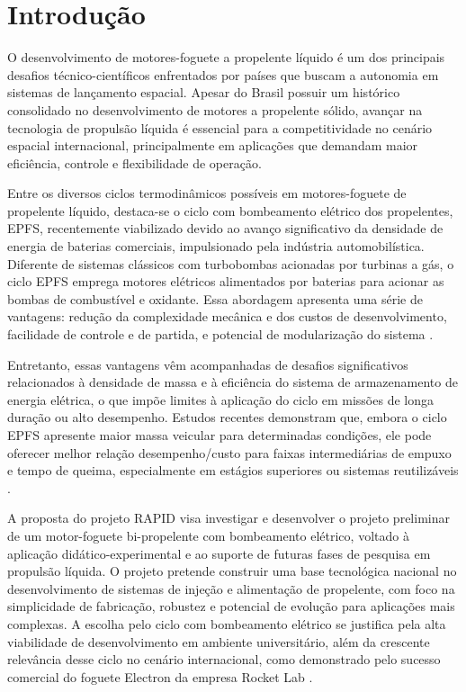 \chapter{Introdução}

O desenvolvimento de motores-foguete a propelente líquido é um dos principais desafios técnico-científicos enfrentados por países que buscam a autonomia em sistemas de lançamento espacial. Apesar do Brasil possuir um histórico consolidado no desenvolvimento de motores a propelente sólido, avançar na tecnologia de propulsão líquida é essencial para a competitividade no cenário espacial internacional, principalmente em aplicações que demandam maior eficiência, controle e flexibilidade de operação.

Entre os diversos ciclos termodinâmicos possíveis em motores-foguete de propelente líquido, destaca-se o ciclo com bombeamento elétrico dos propelentes, \Gls{EPFS}, recentemente viabilizado devido ao avanço significativo da densidade de energia de baterias comerciais, impulsionado pela indústria automobilística. Diferente de sistemas clássicos com turbobombas acionadas por turbinas a gás, o ciclo \Gls{EPFS} emprega motores elétricos alimentados por baterias para acionar as bombas de combustível e oxidante. Essa abordagem apresenta uma série de vantagens: redução da complexidade mecânica e dos custos de desenvolvimento, facilidade de controle e de partida, e potencial de modularização do sistema \cite{liuConceptKeyTechnology2021a}.

Entretanto, essas vantagens vêm acompanhadas de desafios significativos relacionados à densidade de massa e à eficiência do sistema de armazenamento de energia elétrica, o que impõe limites à aplicação do ciclo em missões de longa duração ou alto desempenho. Estudos recentes demonstram que, embora o ciclo \Gls{EPFS} apresente maior massa veicular para determinadas condições, ele pode oferecer melhor relação desempenho/custo para faixas intermediárias de empuxo e tempo de queima, especialmente em estágios superiores ou sistemas reutilizáveis \cite{Berg2023}.

A proposta do projeto \Gls{RAPID} visa investigar e desenvolver o projeto preliminar de um motor-foguete bi-propelente com bombeamento elétrico, voltado à aplicação didático-experimental e ao suporte de futuras fases de pesquisa em propulsão líquida. O projeto pretende construir uma base tecnológica nacional no desenvolvimento de sistemas de injeção e alimentação de propelente, com foco na simplicidade de fabricação, robustez e potencial de evolução para aplicações mais complexas. A escolha pelo ciclo com bombeamento elétrico se justifica pela alta viabilidade de desenvolvimento em ambiente universitário, além da crescente relevância desse ciclo no cenário internacional, como demonstrado pelo sucesso comercial do foguete Electron da empresa Rocket Lab \cite{RocketLab2017}.

